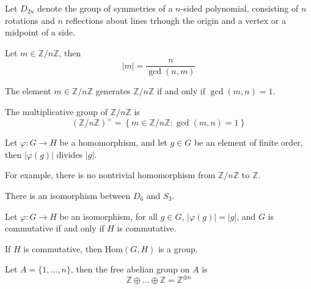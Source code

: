 \documentclass[openany]{book}
\newcommand{\Z}{\mathbb{Z}}
\begin{document}
\begin{defn}
    Let $D_{2n}$ denote the group of symmetries of a $n$-sided polynomial, consisting of $n$ rotations and $n$ reflections about lines trhough the origin and a vertex or a midpoint of a side.
\end{defn}

\begin{prop}
    Let $m\in\Z/n\Z$, then 
    \begin{equation*}
        |m|=\frac{n}{\gcd(n,m)}
    \end{equation*} 
\end{prop}

\begin{cor}
    The element $m\in\Z/n\Z$ generates $\Z/n\Z$ if and only if $\gcd(m,n)=1$.
\end{cor}


\begin{defn}[Multiplicative $(\Z/n\Z)^\times$]
    The multiplicative group of $\Z/n\Z$ is 
    \begin{equation*}
        \left(\Z/n\Z\right)^\times=\left\{m\in\Z/n\Z: \gcd(m,n)=1\right\}
    \end{equation*}
\end{defn}

\begin{prop}
    Let $\varphi:G\to H$ be a homomorphism, and let $g\in G$ be an element of finite order, then $|\varphi(g)|$ divides $|g|$.

    For example, there is no nontrivial homomorphism from $\Z/n\Z$ to $\Z$.
\end{prop}

\begin{prop}
    There is an isomorphism between $D_6$ and $S_3$.
\end{prop}

\begin{prop}
    Let $\varphi: G\to H$ be an isomorphism, for all $g\in G$, $|\varphi(g)|=|g|$, and $G$ is commutative if and only if $H$ is commutative.
\end{prop}

\begin{prop}
    If $H$ is commutative, then $\text{Hom}(G,H) $ is a group.
\end{prop}

\begin{defn}
    Let $A=\{1,\dots, n\}$, then the free abelian group on $A$ is 
    \begin{equation*}
        \Z\oplus\dots\oplus\Z=\Z^{\oplus n}
    \end{equation*}
\end{defn}
\end{document}

